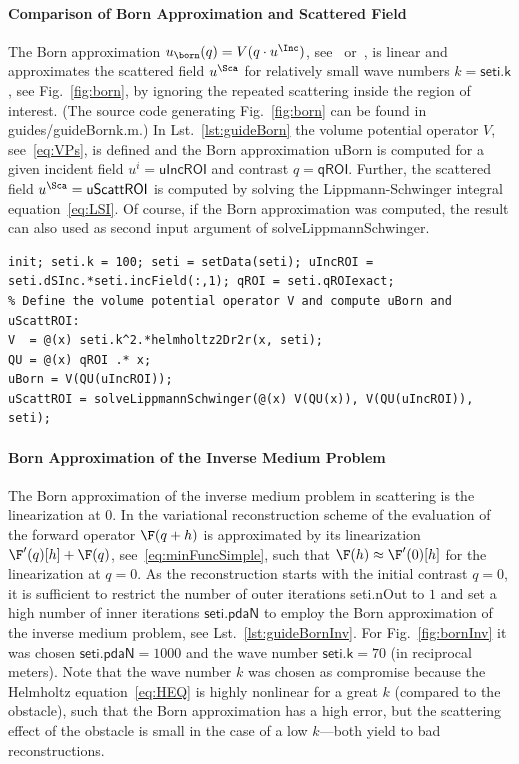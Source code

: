 \documentclass[a4paper]{article}
\begin{document}
%

\paragraph{Comparison of Born Approximation and Scattered Field}
%
The Born approximation $u_\born(q) = V(q \cdot u^\Inc)$, see~\cite[Ch.~4.2]{Kirsch2008} or~\cite{Born1926}, is linear and approximates the scattered field $u^\Sca$ for relatively small wave numbers $k = \textsf{seti.k}$, see Fig.~\ref{fig:born}, by ignoring the repeated scattering inside the region of interest. (The source code generating Fig.~\ref{fig:born} can be found in \textsf{guides/\allowbreak guideBornk.m}.) 
In Lst.~\ref{lst:guideBorn} the volume potential operator $V$, see~\eqref{eq:VPs}, is defined and the Born approximation \textsf{uBorn} is computed for a given incident field $u^i = \textsf{uIncROI}$ and contrast $q = \textsf{qROI}$. Further, the scattered field $u^\Sca = \textsf{uScattROI}$ is computed by solving the Lippmann-Schwinger integral equation~\eqref{eq:LSI}. Of course, if the Born approximation was computed, the result can also used as second input argument of \textsf{solveLippmannSchwinger}.

\begin{lstlisting}[caption={Comparison of Born approximation and scattered field (\emph{source code}: \textsf{guides/guideBorn.m}).},label=lst:guideBorn]
% Generate uIncROI (e.g. of 1st transmitter) and qROI:
init; seti.k = 100; seti = setData(seti); uIncROI = seti.dSInc.*seti.incField(:,1); qROI = seti.qROIexact;
% Define the volume potential operator V and compute uBorn and uScattROI:
V  = @(x) seti.k^2.*helmholtz2Dr2r(x, seti);
QU = @(x) qROI .* x;
uBorn = V(QU(uIncROI));
uScattROI = solveLippmannSchwinger(@(x) V(QU(x)), V(QU(uIncROI)), seti); 
\end{lstlisting}

%

\paragraph{Born Approximation of the Inverse Medium Problem}
%
The Born approximation of the inverse medium problem in scattering is the linearization at $0$. In the variational reconstruction scheme of \IPscatt the evaluation of the forward operator $\F(q+h)$ is approximated by its linearization $\F'(q)[h]+\F(q)$, see~\eqref{eq:minFuncSimple}, such that $\F(h) \approx \F'(0)[h]$ for the linearization at $q = 0$. As the reconstruction starts with the initial contrast $q = 0$, it is sufficient to restrict the number of outer iterations \textsf{seti.nOut} to $1$ and set a high number of inner iterations $\textsf{seti.pdaN}$ to employ the Born approximation of the inverse medium problem, see Lst.~\ref{lst:guideBornInv}. For Fig.~\ref{fig:bornInv} it was chosen $\textsf{seti.pdaN} = 1000$ and the wave number $\textsf{seti.k} = 70$ (in reciprocal meters).
%
Note that the wave number $k$ was chosen as compromise because the Helmholtz equation~\eqref{eq:HEQ} is highly nonlinear for a great $k$ (compared to the obstacle), such that the Born approximation has a high error, but the scattering effect of the obstacle is small in the case of a low $k$---both yield to bad reconstructions.
\end{document}
